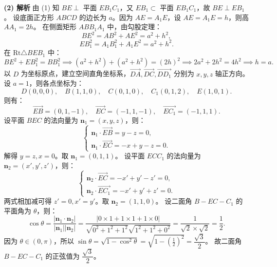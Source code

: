 \begin{answer}
\textbf{(2) 解析}
由 (1) 知 $BE \perp$ 平面 $EB_1C_1$，又 $EB_1 \subset$ 平面 $EB_1C_1$，故 $BE \perp EB_1$。
设底面正方形 $ABCD$ 的边长为 $a$。因为 $AE = A_1E$，设 $AE = A_1E = h$，则高 $AA_1 = 2h$。
在侧面矩形 $ABB_1A_1$ 中，由勾股定理：
\nopagebreak[4]
\[BE^2 = AB^2 + AE^2 = a^2 + h^2,\]
\nopagebreak[4]
\[EB_1^2 = A_1B_1^2 + A_1E^2 = a^2 + h^2.\]
在 $\text{Rt}\triangle BEB_1$ 中：
\nopagebreak[4]
\[BE^2 + EB_1^2 = BB_1^2 \implies (a^2 + h^2) + (a^2 + h^2) = (2h)^2 \implies 2a^2 + 2h^2 = 4h^2 \implies h = a.\]
以 $D$ 为坐标原点，建立空间直角坐标系，$\vec{DA}, \vec{DC}, \vec{DD_1}$ 分别为 $x, y, z$ 轴正方向。
设 $a = 1$，则各点坐标为：
\nopagebreak[4]
\[D(0, 0, 0), \quad B(1, 1, 0), \quad C(0, 1, 0), \quad C_1(0, 1, 2), \quad E(1, 0, 1).\]
则有：
\nopagebreak[4]
\[\vec{EB} = (0, 1, -1), \quad \vec{EC} = (-1, 1, -1), \quad \vec{EC_1} = (-1, 1, 1).\]
设平面 $BEC$ 的法向量为 $\boldsymbol{n}_1 = (x, y, z)$，则：
\nopagebreak[4]
\[\begin{cases} \boldsymbol{n}_1 \cdot \vec{EB} = y - z = 0, \\ \boldsymbol{n}_1 \cdot \vec{EC} = -x + y - z = 0. \end{cases}\]
解得 $y = z, x = 0$。取 $\boldsymbol{n}_1 = (0, 1, 1)$。
设平面 $ECC_1$ 的法向量为 $\boldsymbol{n}_2 = (x', y', z')$，则：
\nopagebreak[4]
\[\begin{cases} \boldsymbol{n}_2 \cdot \vec{EC} = -x' + y' - z' = 0, \\ \boldsymbol{n}_2 \cdot \vec{EC_1} = -x' + y' + z' = 0. \end{cases}\]
两式相加减可得 $z' = 0, x' = y'$。取 $\boldsymbol{n}_2 = (1, 1, 0)$。
设二面角 $B-EC-C_1$ 的平面角为 $\theta$，则：
\nopagebreak[4]
\[\cos\theta = \frac{|\boldsymbol{n}_1 \cdot \boldsymbol{n}_2|}{|\boldsymbol{n}_1| |\boldsymbol{n}_2|} = \frac{|0 \times 1 + 1 \times 1 + 1 \times 0|}{\sqrt{0^2 + 1^2 + 1^2}\sqrt{1^2 + 1^2 + 0^2}} = \frac{1}{\sqrt{2} \times \sqrt{2}} = \frac{1}{2}.\]
因为 $\theta \in (0, \pi)$，所以 $\sin\theta = \sqrt{1 - \cos^2\theta} = \sqrt{1 - \left(\frac{1}{2}\right)^2} = \dfrac{\sqrt{3}}{2}$。
故二面角 $B-EC-C_1$ 的正弦值为 $\dfrac{\sqrt{3}}{2}$。



\end{answer}
